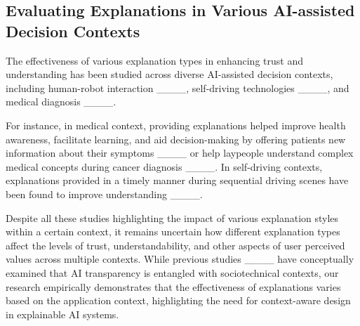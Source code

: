 \subsection{Evaluating Explanations in Various AI-assisted Decision Contexts}
\label{sec:related-work-context}

The effectiveness of various explanation types in enhancing trust and understanding has been studied across diverse AI-assisted decision contexts, including human-robot interaction ____, self-driving technologies ____, and medical diagnosis ____.

For instance, in medical context, providing explanations helped improve health awareness, facilitate learning, and aid decision-making by offering patients new information about their symptoms ____ or help laypeople understand complex medical concepts during cancer diagnosis ____. In self-driving contexts, explanations provided in a timely manner during sequential driving scenes have been found to improve understanding ____.

Despite all these studies highlighting the impact of various explanation styles within a certain context, it remains uncertain how different explanation types affect the levels of trust, understandability, and other aspects of user perceived values across multiple contexts. While previous studies ____ have conceptually examined that AI transparency is entangled with sociotechnical contexts, our research empirically demonstrates that the effectiveness of explanations varies based on the application context, highlighting the need for context-aware design in explainable AI systems.